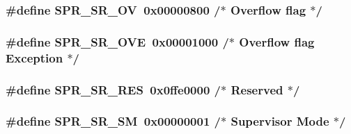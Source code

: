 \hypertarget{spr-defs_8h_a33c465a2750a0309808bdbdc493e2cbf}{
\subsubsection[{\-S\-P\-R\-\_\-\-S\-R\-\_\-\-O\-V}]{\setlength{\rightskip}{0pt plus 5cm}\#define {\bf \-S\-P\-R\-\_\-\-S\-R\-\_\-\-O\-V}~0x00000800  /$\ast$ Overflow flag $\ast$/}}\label{spr-defs_8h_a33c465a2750a0309808bdbdc493e2cbf}
\hypertarget{spr-defs_8h_af6dff5d1767a530a382638c7bf0a65a8}{
\subsubsection[{\-S\-P\-R\-\_\-\-S\-R\-\_\-\-O\-V\-E}]{\setlength{\rightskip}{0pt plus 5cm}\#define {\bf \-S\-P\-R\-\_\-\-S\-R\-\_\-\-O\-V\-E}~0x00001000  /$\ast$ Overflow flag Exception $\ast$/}}\label{spr-defs_8h_af6dff5d1767a530a382638c7bf0a65a8}
\hypertarget{spr-defs_8h_a44cf478fe917eecf65a8403ac18d8758}{
\subsubsection[{\-S\-P\-R\-\_\-\-S\-R\-\_\-\-R\-E\-S}]{\setlength{\rightskip}{0pt plus 5cm}\#define {\bf \-S\-P\-R\-\_\-\-S\-R\-\_\-\-R\-E\-S}~0x0ffe0000  /$\ast$ Reserved $\ast$/}}\label{spr-defs_8h_a44cf478fe917eecf65a8403ac18d8758}
\hypertarget{spr-defs_8h_a971b66b10515c0625c24c14eb9d8260c}{
\subsubsection[{\-S\-P\-R\-\_\-\-S\-R\-\_\-\-S\-M}]{\setlength{\rightskip}{0pt plus 5cm}\#define {\bf \-S\-P\-R\-\_\-\-S\-R\-\_\-\-S\-M}~0x00000001  /$\ast$ Supervisor Mode $\ast$/}}\label{spr-defs_8h_a971b66b10515c0625c24c14eb9d8260c}
